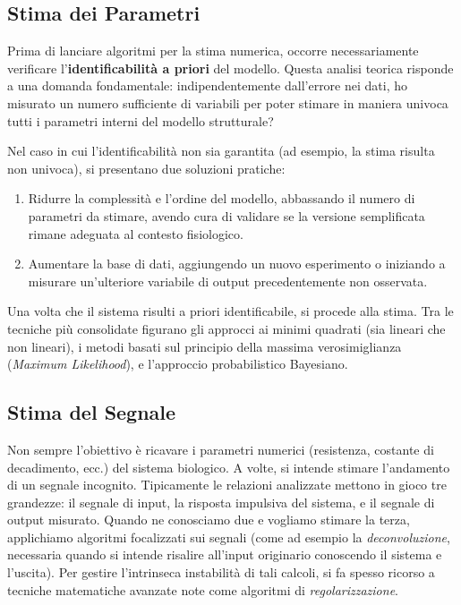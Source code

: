 \subsection{Stima dei Parametri}
Prima di lanciare algoritmi per la stima numerica, occorre necessariamente verificare l'\textbf{identificabilità a priori} del modello. Questa analisi teorica risponde a una domanda fondamentale: indipendentemente dall'errore nei dati, ho misurato un numero sufficiente di variabili per poter stimare in maniera univoca tutti i parametri interni del modello strutturale? 

Nel caso in cui l'identificabilità non sia garantita (ad esempio, la stima risulta non univoca), si presentano due soluzioni pratiche:
\begin{enumerate}
    \item Ridurre la complessità e l'ordine del modello, abbassando il numero di parametri da stimare, avendo cura di validare se la versione semplificata rimane adeguata al contesto fisiologico.
    \item Aumentare la base di dati, aggiungendo un nuovo esperimento o iniziando a misurare un'ulteriore variabile di output precedentemente non osservata.
\end{enumerate}
Una volta che il sistema risulti a priori identificabile, si procede alla stima. Tra le tecniche più consolidate figurano gli approcci ai minimi quadrati (sia lineari che non lineari), i metodi basati sul principio della massima verosimiglianza (\emph{Maximum Likelihood}), e l'approccio probabilistico Bayesiano.

\subsection{Stima del Segnale}
Non sempre l'obiettivo è ricavare i parametri numerici (resistenza, costante di decadimento, ecc.) del sistema biologico. A volte, si intende stimare l'andamento di un segnale incognito. Tipicamente le relazioni analizzate mettono in gioco tre grandezze: il segnale di input, la risposta impulsiva del sistema, e il segnale di output misurato. 
Quando ne conosciamo due e vogliamo stimare la terza, applichiamo algoritmi focalizzati sui segnali (come ad esempio la \emph{deconvoluzione}, necessaria quando si intende risalire all'input originario conoscendo il sistema e l'uscita). Per gestire l'intrinseca instabilità di tali calcoli, si fa spesso ricorso a tecniche matematiche avanzate note come algoritmi di \emph{regolarizzazione}.